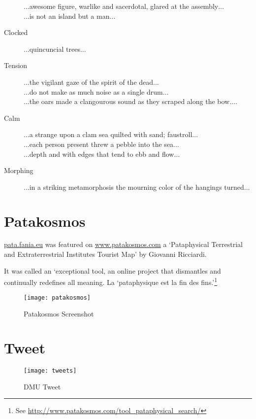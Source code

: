 \begin{description}
                $\ldots$awesome figure, warlike and sacerdotal, glared at the assembly$\ldots$\\
                $\ldots$is not an island but a man$\ldots$
  \item [Clocked] $\ldots$quincuncial trees$\ldots$
  \item [Tension] $\ldots$the vigilant gaze of the spirit of the dead$\ldots$\\
                    $\ldots$do not make as much noise as a single drum$\ldots$\\
                    $\ldots$the oars made a clangourous sound as they scraped along the bow$\ldots$.
  \item [Calm] $\ldots$a strange upon a clam sea quilted with sand; faustroll$\ldots$\\
                  $\ldots$each person present threw a pebble into the sea$\ldots$\\
                  $\ldots$depth and with edges that tend to ebb and flow$\ldots$
  \item [Morphing] $\ldots$in a striking metamorphosis the mourning color of the hangings turned$\ldots$
\end{description}

\spirals




\section{Patakosmos}

\url{pata.fania.eu} was featured on \url{www.patakosmos.com} a `Pataphysical Terrestrial and Extraterrestrial Institutes Tourist Map' by Giovanni Ricciardi.

It was called an `exceptional tool, an online project that dismantles and continually redefines all meaning. La ‘pataphysique est la fin des fins.'\footnote{See \url{http://www.patakosmos.com/tool_pataphysical_search/}}

\begin{figure}[h!]
  \centering
  \texttt{[image: patakosmos]}
\caption[Patakosmos Screenshot]{Patakosmos Screenshot}
\label{fig:patakosmos}
\end{figure}


\section{Tweet}

\begin{figure}[h!]
  \centering
  \texttt{[image: tweets]}
\caption[DMU Tweet]{DMU Tweet}
\label{fig:tweet}
\end{figure}



\stopcontents[chapters]
